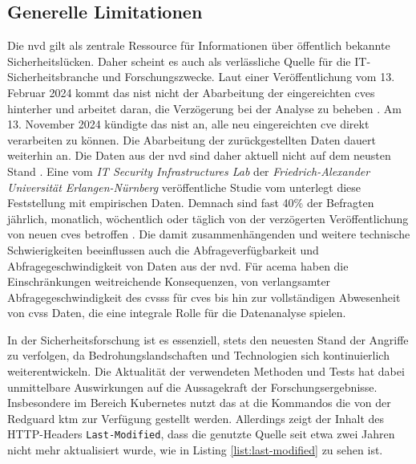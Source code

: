 \subsection{Generelle Limitationen}
\label{limitation-generell}
\par Die \gls{nvd} gilt als zentrale Ressource für Informationen über öffentlich bekannte Sicherheitslücken. Daher scheint es auch als verlässliche Quelle für die IT-Sicherheitsbranche und Forschungszwecke. Laut einer Veröffentlichung vom 13. Februar 2024 kommt das \gls{nist} nicht der Abarbeitung der eingereichten \glspl{cve} hinterher und arbeitet daran, die Verzögerung bei der Analyse zu beheben \autocite{NVDProgramAnnouncement}. Am 13. November 2024 kündigte das \gls{nist} an, alle neu eingereichten \gls{cve} direkt verarbeiten zu können. Die Abarbeitung der zurückgestellten Daten dauert weiterhin an. Die Daten aus der \gls{nvd} sind daher aktuell nicht auf dem neusten Stand \autocite{NationalVulnerabilityDatabase2024}. Eine vom \textit{IT Security Infrastructures Lab} der \textit{Friedrich-Alexander Universität Erlangen-Nürnberg} veröffentliche Studie vom  unterlegt diese Feststellung mit empirischen Daten. Demnach sind fast 40\% der Befragten jährlich, monatlich, wöchentlich oder täglich von der verzögerten Veröffentlichung von neuen \glspl{cve} betroffen \autocite{wunderNVDUsersAttitudes2024}. Die damit zusammenhängenden und weitere technische Schwierigkeiten beeinflussen auch die Abfrageverfügbarkeit und Abfragegeschwindigkeit von Daten aus der \gls{nvd}. Für \gls{acema} haben die Einschränkungen weitreichende Konsequenzen, von verlangsamter Abfragegeschwindigkeit des \gls{cvss}s für \glspl{cve} bis hin zur vollständigen Abwesenheit von \gls{cvss} Daten, die eine integrale Rolle für die Datenanalyse spielen.
%
\par In der Sicherheitsforschung ist es essenziell, stets den neuesten Stand der Angriffe zu verfolgen, da Bedrohungslandschaften und Technologien sich kontinuierlich weiterentwickeln. Die Aktualität der verwendeten Methoden und Tests hat dabei unmittelbare Auswirkungen auf die Aussagekraft der Forschungsergebnisse. Insbesondere im Bereich Kubernetes nutzt das \gls{at} die Kommandos die von der Redguard \gls{ktm} zur Verfügung gestellt werden. Allerdings zeigt der Inhalt des HTTP-Headers \verb|Last-Modified|, dass die genutzte Quelle seit etwa zwei Jahren nicht mehr aktualisiert wurde, wie in Listing \ref{list:last-modified} zu sehen ist.


